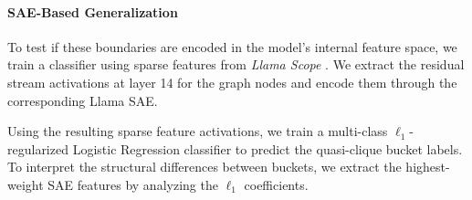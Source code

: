 \paragraph{SAE-Based Generalization} To test if these boundaries are encoded in the model's internal feature space, we train a classifier using sparse features from \emph{Llama Scope} \citep{he2024llamascope}. We extract the residual stream activations at layer 14 for the graph nodes and encode them through the corresponding Llama SAE. 

Using the resulting sparse feature activations, we train a multi-class $\ell_1$-regularized Logistic Regression classifier to predict the quasi-clique bucket labels. To interpret the structural differences between buckets, we extract the highest-weight SAE features by analyzing the $\ell_1$ coefficients. 
 